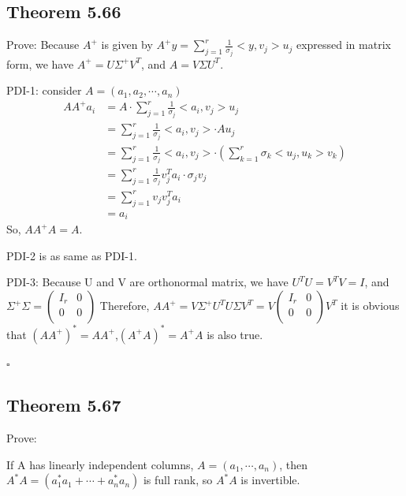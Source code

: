 \documentclass[a4paper]{article}
\begin{document}
\subsection*{Theorem 5.66}
Prove:
Because $A^{+}$ is given by $A^{+}y = \sum_{j = 1}^{r} \frac{1}{\sigma _{j}} <y,v_{j}>u_{j}$ 
expressed in matrix form, we have $A^{+} = U\varSigma ^{+}V^{T}$, and $A=V\varSigma U^{T}$.

PDI-1: consider $A=(a_{1}, a_{2}, \cdots, a_{n})$
\begin{align}
    AA^{+}a_{i} &= A\cdot \sum_{j = 1}^{r} \frac{1}{\sigma _{j}} <a_{i}, v_{j}>u_{j} \\
                &= \sum_{j = 1}^{r} \frac{1}{\sigma _{j}} <a_{i}, v_{j}>\cdot Au_{j} \\
                &= \sum_{j = 1}^{r} \frac{1}{\sigma _{j}} <a_{i}, v_{j}>\cdot (\sum_{k = 1}^{r} \sigma _{k} <u_{j},u_{k}>v_{k}) \\
                &= \sum_{j = 1}^{r} \frac{1}{\sigma _{j}} v_{j}^{T}a_{i}\cdot \sigma _{j} v_{j}\\
                &= \sum_{j = 1}^{r} v_{j} v_{j}^{T}a_{i} \\
                &= a_{i}
\end{align}
So, $AA^{+}A = A$.

PDI-2 is as same as PDI-1.

PDI-3:
Because U and V are orthonormal matrix, we have $U^{T}U = V^{T}V = I$, 
and $\varSigma ^{+} \varSigma = \begin{pmatrix}
    I_{r} & 0 \\
    0 & 0 \\
\end{pmatrix}
$
Therefore, $AA^{+} = V\varSigma ^{+}U^{T}U\varSigma V^{T} = V\begin{pmatrix}
    I_{r} & 0 \\
    0 & 0 \\
\end{pmatrix} V^{T}$
it is obvious that $(AA^{+})^{*} = AA^{+}$,$(A^{+}A)^{*} = A^{+}A$ is also true.

\begin{flushright} %
  $\square$ 
\end{flushright} 

\subsection*{Theorem 5.67}
Prove:

If A has linearly independent columns, $A=(a_{1},\cdots,a_{n})$, 
then $A^{*}A = (a_{1}^{*}a_{1} + \cdots + a_{n}^{*}a_{n})$ is full rank, so $A^{*}A$ is invertible.
\end{document}
